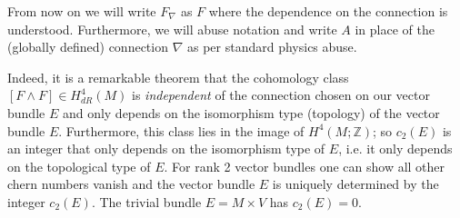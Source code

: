 \documentclass[12pt, onecolumn]{article}
\newenvironment{remark}[1][Remark]{\begin{trivlist}
\item[\hskip \labelsep {\bfseries #1}]}{\end{trivlist}}
\newenvironment{notation}[1][Notation]{\begin{trivlist}
\item[\hskip \labelsep {\bfseries #1}]}{\end{trivlist}}
\begin{document}
\begin{notation}
From now on we will write $F_{\nabla}$ as $F$ where the dependence on the connection is understood.  Furthermore, we will abuse notation and write $A$ in place of the (globally defined) connection $\nabla$ as per standard physics abuse.
\end{notation}

\begin{remark} Indeed, it is a remarkable theorem that the cohomology class $[F \wedge F] \in H^4_{dR}(M)$ is \textit{independent} of the connection chosen on our vector bundle $E$ and only depends on the isomorphism type (topology) of the vector bundle $E$.  Furthermore, this class lies in the image of $H^4(M;\mathbb{Z})$; so $c_{2}(E)$ is an integer that only depends on the isomorphism type of $E$, i.e. it only depends on the topological type of $E$.  For rank 2 vector bundles one can show all other chern numbers vanish and the vector bundle $E$ is uniquely determined by the integer $c_{2}(E)$.  The trivial bundle $E=M \times V$ has $c_{2}(E)=0$.
\end{remark}
\end{document}
